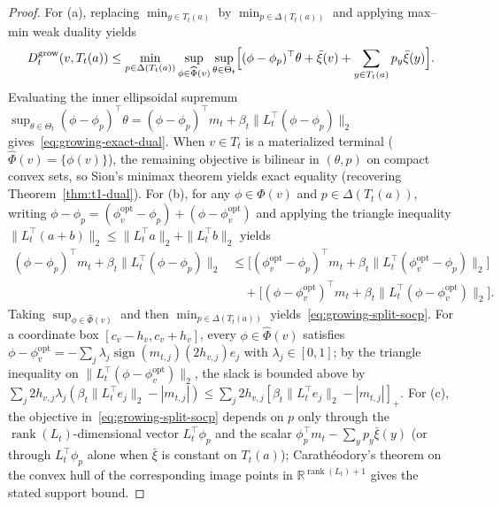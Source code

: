 \documentclass{article}
\theoremstyle{plain}
\theoremstyle{definition}
\begin{document}
\begin{proof}
For (a), replacing $\min_{y \in T_t(a)}$ by $\min_{p \in \Delta(T_t(a))}$ and applying max--min weak duality yields
\[
  D_t^{\mathrm{grow}}(v, T_t(a))
  \le \min_{p \in \Delta(T_t(a))} \sup_{\phi \in \widehat\Phi(v)} \sup_{\theta \in \Theta_t}
      \Bigl[(\phi - \phi_p)^\top \theta + \bar\xi(v) + \sum_{y \in T_t(a)} p_y \bar\xi(y)\Bigr].
\]
Evaluating the inner ellipsoidal supremum $\sup_{\theta \in \Theta_t} (\phi - \phi_p)^\top \theta = (\phi - \phi_p)^\top m_t + \beta_t \|L_t^\top(\phi - \phi_p)\|_2$ gives~\eqref{eq:growing-exact-dual}. When $v \in T_t$ is a materialized terminal ($\widehat\Phi(v) = \{\phi(v)\}$), the remaining objective is bilinear in $(\theta, p)$ on compact convex sets, so Sion's minimax theorem yields exact equality (recovering Theorem~\ref{thm:t1-dual}). For (b), for any $\phi \in \widehat\Phi(v)$ and $p \in \Delta(T_t(a))$, writing $\phi - \phi_p = (\phi_v^{\mathrm{opt}} - \phi_p) + (\phi - \phi_v^{\mathrm{opt}})$ and applying the triangle inequality $\|L_t^\top(a + b)\|_2 \le \|L_t^\top a\|_2 + \|L_t^\top b\|_2$ yields
\begin{align*}
  (\phi - \phi_p)^\top m_t + \beta_t \|L_t^\top(\phi - \phi_p)\|_2
  &\le \bigl[(\phi_v^{\mathrm{opt}} - \phi_p)^\top m_t + \beta_t \|L_t^\top(\phi_v^{\mathrm{opt}} - \phi_p)\|_2\bigr] \\
  &\quad + \bigl[(\phi - \phi_v^{\mathrm{opt}})^\top m_t + \beta_t \|L_t^\top(\phi - \phi_v^{\mathrm{opt}})\|_2\bigr].
\end{align*}
Taking $\sup_{\phi \in \widehat\Phi(v)}$ and then $\min_{p \in \Delta(T_t(a))}$ yields~\eqref{eq:growing-split-socp}. For a coordinate box $[c_v - h_v, c_v + h_v]$, every $\phi \in \widehat\Phi(v)$ satisfies $\phi - \phi_v^{\mathrm{opt}} = -\sum_j \lambda_j \operatorname{sign}(m_{t,j}) (2 h_{v,j}) e_j$ with $\lambda_j \in [0, 1]$; by the triangle inequality on $\|L_t^\top (\phi - \phi_v^{\mathrm{opt}})\|_2$, the slack is bounded above by $\sum_j 2 h_{v,j} \lambda_j (\beta_t \|L_t^\top e_j\|_2 - |m_{t,j}|) \le \sum_j 2 h_{v,j} [\beta_t \|L_t^\top e_j\|_2 - |m_{t,j}|]_+$. For (c), the objective in~\eqref{eq:growing-split-socp} depends on $p$ only through the $\operatorname{rank}(L_t)$-dimensional vector $L_t^\top \phi_p$ and the scalar $\phi_p^\top m_t - \sum_y p_y \bar\xi(y)$ (or through $L_t^\top \phi_p$ alone when $\bar\xi$ is constant on $T_t(a)$); Carath\'eodory's theorem on the convex hull of the corresponding image points in $\mathbb{R}^{\operatorname{rank}(L_t) + 1}$ gives the stated support bound.
\end{proof}
\end{document}
